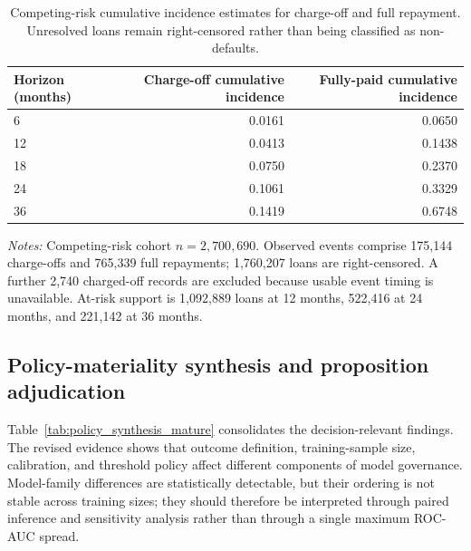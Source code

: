 \documentclass[10pt]{article}
\begin{document}
\begin{table}[!ht]
\centering
\caption{Competing-risk cumulative incidence estimates for charge-off and full repayment. Unresolved loans remain right-censored rather than being classified as non-defaults.}
\label{tab:competing_risk}
\begin{tabular}{lrr}
\toprule
Horizon (months) & Charge-off cumulative incidence & Fully-paid cumulative incidence \\
\midrule
6  & 0.0161 & 0.0650 \\
12 & 0.0413 & 0.1438 \\
18 & 0.0750 & 0.2370 \\
24 & 0.1061 & 0.3329 \\
36 & 0.1419 & 0.6748 \\
\bottomrule
\end{tabular}

\vspace{3pt}
{\footnotesize \textit{Notes:} Competing-risk cohort $n=2{,}700{,}690$. Observed events comprise 175,144 charge-offs and 765,339 full repayments; 1,760,207 loans are right-censored. A further 2,740 charged-off records are excluded because usable event timing is unavailable. At-risk support is 1,092,889 loans at 12 months, 522,416 at 24 months, and 221,142 at 36 months.}
\end{table}



\subsection{Policy-materiality synthesis and proposition adjudication}
\label{sec:adjudication}

Table~\ref{tab:policy_synthesis_mature} consolidates the decision-relevant findings. The revised evidence shows that outcome definition, training-sample size, calibration, and threshold policy affect different components of model governance. Model-family differences are statistically detectable, but their ordering is not stable across training sizes; they should therefore be interpreted through paired inference and sensitivity analysis rather than through a single maximum ROC-AUC spread.
\end{document}
